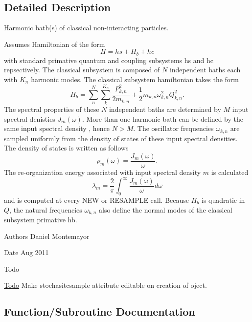 \subsection{Detailed Description}
Harmonic bath(s) of classical non-\/interacting particles. 

Assumes Hamiltonian of the form \[ H=hs+H_b+hc \] with standard primative quantum and coupling subsystems hs and hc repsectively. The classical subsystem is composed of $ N $ independent baths each with $ K_n $ harmonic modes. The classical subsystem hamiltonian takes the form \[ H_b=\sum_n^N \sum_k^{K_n} \frac{P_{k,n}^2}{2m_{k,n}}+\frac{1}{2}m_{k,n} \omega_{k,n}^2 Q_{k,n}^2 .\] The spectral properties of these $ N $ independent baths are determined by $ M $ input spectral denisties $ J_m(\omega) $. More than one harmonic bath can be defined by the same input spectral density , hence $ N>M $. The oscillator frequencies $ \omega_{k,n} $ are sampled uniformly from the density of states of these input spectral densities. The density of states is written as follows \[ \rho_m(\omega)=\frac{J_m(\omega)}{\omega} .\] The re-\/organization energy associated with input spectral density $ m $ is calculated \[ \lambda_m=\frac{2}{\pi}\int_0^\infty\frac{J_m(\omega)}{\omega} d\omega \] and is computed at every N\+EW or R\+E\+S\+A\+M\+P\+LE call. Because $H_b$ is quadratic in $Q$, the natural frequencies $ \omega_{k,n} $ also define the normal modes of the classical subsystem primative hb.

\begin{DoxyAuthor}{Authors}
Daniel Montemayor
\end{DoxyAuthor}
\begin{DoxyDate}{Date}
Aug 2011
\end{DoxyDate}
\begin{DoxyRefDesc}{Todo}
\item[\hyperlink{todo__todo000001}{Todo}]Make stochasitcsample attribute editable on creation of oject. \end{DoxyRefDesc}


\subsection{Function/\+Subroutine Documentation}
\mbox{\label{namespaceharmonicbath__class_abde7a862edc5c843e0665c6a6705bd74}} 
